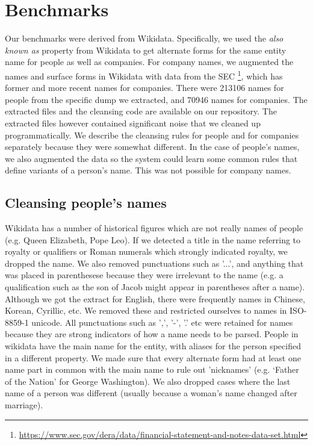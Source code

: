 \section{Benchmarks}
\label{datasets}
Our benchmarks were derived from Wikidata.  Specifically, we used the \textit{also known as} property from Wikidata to get alternate forms for the same entity name for people as well as companies.  For company names, we augmented the names and surface forms in Wikidata with data from the SEC \footnote{\url{https://www.sec.gov/dera/data/financial-statement-and-notes-data-set.html}}, which has former and more recent names for companies.  There were 213106 names for people from the specific dump we extracted, and 70946 names for companies.  The extracted files and the cleansing code are available on our repository. The extracted files however contained significant noise that we cleaned up programmatically.  We describe the cleansing rules for people and for companies separately because they were somewhat different.  In the case of people's names, we also augmented the data so the system could learn some common rules that define variants of a person's name.  This was not possible for company names.

\subsection{Cleansing people's names}
Wikidata has a number of historical figures which are not really names of people (e.g. Queen Elizabeth, Pope Leo).  If we detected a title in the name referring to royalty or qualifiers or Roman numerals which strongly indicated royalty, we dropped the name.  We also removed punctuations such as '...', and anything that was placed in parenthesese because they were irrelevant to the name (e.g. a qualification such as the son of Jacob might appear in parentheses after a name).  Although we got the extract for English, there were frequently names in Chinese, Korean, Cyrillic, etc.  We removed these and restricted ourselves to names in ISO-8859-1 unicode.  All punctuations such as ',', '-', '.' etc were retained for names because they are strong indicators of how a name needs to be parsed.  People in wikidata have the main name for the entity, with aliases for the person specified in a different property.  We made sure that every alternate form had at least one name part in common with the main name to rule out 'nicknames' (e.g. `Father of the Nation' for George Washington).  We also dropped cases where the last name of a person was different (usually because a woman's name changed after marriage).      

